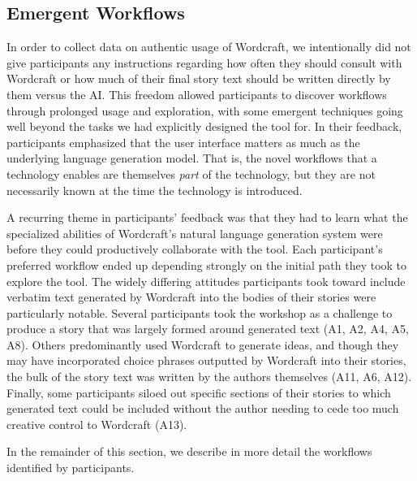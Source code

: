 \subsection{Emergent Workflows}
In order to collect data on authentic usage of Wordcraft, we intentionally did not give participants any instructions regarding how often they should consult with Wordcraft or how much of their final story text should be written directly by them versus the AI.
This freedom allowed participants to discover workflows through prolonged usage and exploration, with some emergent techniques going well beyond the tasks we had explicitly designed the tool for.
In their feedback, participants emphasized that the user interface matters as much as the underlying language generation model.
That is, the novel workflows that a technology enables are themselves \textit{part} of the technology, but they are not necessarily known at the time the technology is introduced.

A recurring theme in participants' feedback was that they had to learn what the specialized abilities of Wordcraft's natural language generation system were before they could productively collaborate with the tool. 
Each participant's preferred workflow ended up depending strongly on the initial path they took to explore the tool.
The widely differing attitudes participants took toward include verbatim text generated by Wordcraft into the bodies of their stories were particularly notable.
Several participants took the workshop as a challenge to produce a story that was largely formed around generated text (A1, A2, A4, A5, A8).
Others predominantly used Wordcraft to generate ideas, and though they may have incorporated choice phrases outputted by Wordcraft into their stories, the bulk of the story text was written by the authors themselves (A11, A6, A12).
Finally, some participants siloed out specific sections of their stories to which generated text could be included without the author needing to cede too much creative control to Wordcraft (A13).

In the remainder of this section, we describe in more detail the workflows identified by participants.

